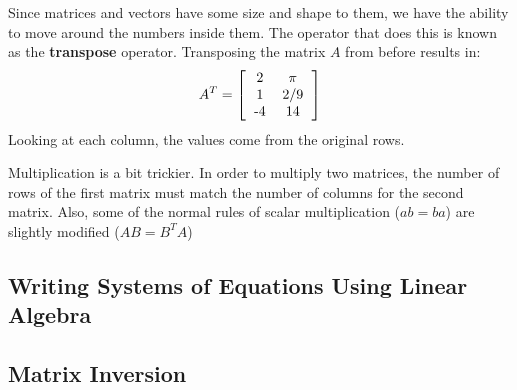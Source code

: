 Since matrices and vectors have some size and shape to them, we have the ability to move around the numbers inside them.  The operator that does this is known as the {\bf transpose} operator.  Transposing the matrix $A$ from before results in:
\begin{equation*}
  A^T = \left[
    \begin{tabular}{cc}
      2 & $\pi$ \\
      1& $2/9$ \\
      -4 & 14
    \end{tabular}
    \right]
\end{equation*}
Looking at each column, the values come from the original rows.

Multiplication is a bit trickier.  In order to multiply two matrices, the number of rows of the first matrix must match the number of columns for the second matrix.  Also, some of the normal rules of scalar multiplication ($a b = b a$) are slightly modified ($A B = B^T A$)

\subsection*{Writing Systems of Equations Using Linear Algebra}

\subsection*{Matrix Inversion}
